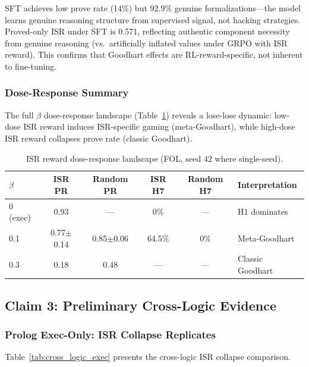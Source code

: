 \documentclass[11pt,a4paper]{article}
\newcommand{\isr}{\textsc{ISR}}
\begin{document}
SFT achieves low prove rate (14\%) but 92.9\% genuine formalizations---the model learns genuine reasoning structure from supervised signal, not hacking strategies.
Proved-only \isr{} under SFT is 0.571, reflecting authentic component necessity from genuine reasoning (vs.\ artificially inflated values under GRPO with ISR reward).
This confirms that Goodhart effects are RL-reward-specific, not inherent to fine-tuning.

\subsubsection{Dose-Response Summary}

The full $\beta$ dose-response landscape (Table~\ref{tab:dose_response}) reveals a lose-lose dynamic: low-dose \isr{} reward induces ISR-specific gaming (meta-Goodhart), while high-dose \isr{} reward collapses prove rate (classic Goodhart).

\begin{table}[h]
\centering
\caption{ISR reward dose-response landscape (FOL, seed 42 where single-seed).}
\label{tab:dose_response}
\begin{tabular}{lccccl}
\toprule
$\beta$ & ISR PR & Random PR & ISR H7 & Random H7 & Interpretation \\
\midrule
0 (exec) & 0.93 & --- & 0\% & --- & H1 dominates \\
0.1 & 0.77$\pm$0.14 & 0.85$\pm$0.06 & 64.5\% & 0\% & Meta-Goodhart \\
0.3 & 0.18 & 0.48 & --- & --- & Classic Goodhart \\
\bottomrule
\end{tabular}
\end{table}


\subsection{Claim 3: Preliminary Cross-Logic Evidence}
\label{sec:claim3}

\subsubsection{Prolog Exec-Only: ISR Collapse Replicates}

Table~\ref{tab:cross_logic_exec} presents the cross-logic ISR collapse comparison.
\end{document}
